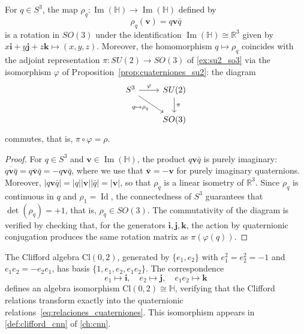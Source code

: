 \begin{proposition}\label{prop:rotaciones_cuaterniones}
For $q \in S^3$, the map $\rho_q: \operatorname{Im}(\mathbb{H}) \to \operatorname{Im}(\mathbb{H})$ defined by
\begin{equation}\label{eq:rotacion_cuaterniones}
\rho_q(\mathbf{v}) = q\mathbf{v}\bar{q}
\end{equation}
is a rotation in $SO(3)$ under the identification $\operatorname{Im}(\mathbb{H}) \cong \mathbb{R}^3$ given by $x\mathbf{i} + y\mathbf{j} + z\mathbf{k} \mapsto (x, y, z)$. Moreover, the homomorphism $q \mapsto \rho_q$ coincides with the adjoint representation $\pi: SU(2) \to SO(3)$ of \autoref{ex:su2_so3} via the isomorphism $\varphi$ of Proposition~\ref{prop:cuaterniones_su2}: the diagram
\[
\begin{tikzcd}
S^3 \arrow{r}{\varphi} \arrow[swap]{dr}{q \mapsto \rho_q} & SU(2) \arrow{d}{\pi} \\
 & SO(3)
\end{tikzcd}
\]
commutes, that is, $\pi \circ \varphi = \rho$.
\end{proposition}

\begin{proof}
For $q \in S^3$ and $\mathbf{v} \in \operatorname{Im}(\mathbb{H})$, the product $q\mathbf{v}\bar{q}$ is purely imaginary: $\overline{q\mathbf{v}\bar{q}} = q\bar{\mathbf{v}}\bar{q} = -q\mathbf{v}\bar{q}$, where we use that $\bar{\mathbf{v}} = -\mathbf{v}$ for purely imaginary quaternions. Moreover, $|q\mathbf{v}\bar{q}| = |q||\mathbf{v}||\bar{q}| = |\mathbf{v}|$, so that $\rho_q$ is a linear isometry of $\mathbb{R}^3$. Since $\rho_q$ is continuous in $q$ and $\rho_1 = \operatorname{Id}$, the connectedness of $S^3$ guarantees that $\det(\rho_q) = +1$, that is, $\rho_q \in SO(3)$. The commutativity of the diagram is verified by checking that, for the generators $\mathbf{i}, \mathbf{j}, \mathbf{k}$, the action by quaternionic conjugation produces the same rotation matrix as $\pi(\varphi(q))$.
\end{proof}

\begin{remark}\label{rem:cuaterniones_clifford}
The Clifford algebra $\text{Cl}(0,2)$, generated by $\{e_1, e_2\}$ with $e_1^2 = e_2^2 = -1$ and $e_1 e_2 = -e_2 e_1$, has basis $\{1, e_1, e_2, e_1 e_2\}$. The correspondence
\[
e_1 \mapsto \mathbf{i}, \quad e_2 \mapsto \mathbf{j}, \quad e_1 e_2 \mapsto \mathbf{k}
\]
defines an algebra isomorphism $\text{Cl}(0,2) \cong \mathbb{H}$, verifying that the Clifford relations transform exactly into the quaternionic relations~\eqref{eq:relaciones_cuaterniones}. This isomorphism appears in \autoref{def:clifford_cnn} of \autoref{ch:cnn}.
\end{remark}

